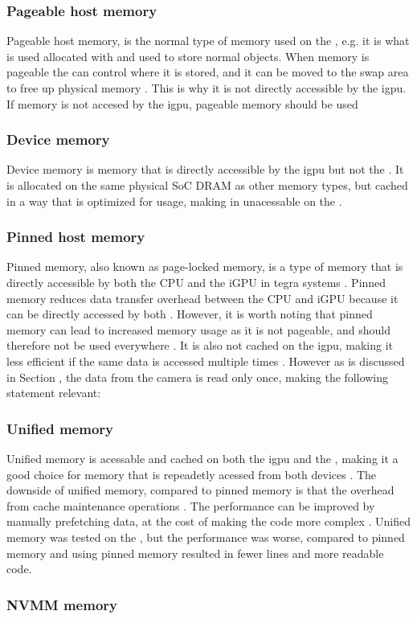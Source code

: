 \subsubsection{Pageable host memory}
Pageable host memory, is the normal type of memory used on the \jx,
e.g. it is what is used allocated with  and used to store normal \py objects.
When memory is pageable the \cpu can control where it is stored, and it can be moved to the \gls{swap} area to free up physical memory \cite[6]{nvidiaCUDAFTegra2023}.
This is why it is not directly accessible by the \gls{igpu}.
If memory is not accesed by the \gls{igpu}, pageable memory should be used \cite[9]{nvidiaCUDAFTegra2023}


\subsubsection{Device memory}
Device memory is memory that is directly accessible by the \gls{igpu} but not the \cpu \cite[5]{nvidiaCUDAFTegra2023}.
It is allocated on the same physical SoC DRAM as other memory types, but cached in a way that is optimized for \gpu usage, making in unacessable on the \cpu \cite[5]{nvidiaCUDAFTegra2023}.


\subsubsection{Pinned host memory}
Pinned memory, also known as page-locked memory, is a type of memory that is directly accessible by both the CPU and the iGPU in \gls{tegra} systems \cite{nvidiaCUDAFTegra2023}.
Pinned memory reduces data transfer overhead between the CPU and iGPU because it can be directly accessed by both \cite{nvidiaCUDAFTegra2023}.
However, it is worth noting that pinned memory can lead to increased memory usage as it is not pageable, and should therefore not be used everywhere \cite[38]{nvidiaCUDABestPractices2023}.
It is also not cached on the \gls{igpu}, making it less efficient if the same data is accessed multiple times \cite{nvidiaCUDAFTegra2023}.
However as is discussed in Section \todo, the data from the camera is read only once, making the following statement relevant:
\cite[10]{nvidiaCUDAFTegra2023}


\subsubsection{Unified memory}
Unified memory is acessable and cached on both the \gls{igpu} and the \cpu, making it a good choice for memory that is repeadetly acessed from both devices \cite[10]{nvidiaCUDAFTegra2023}.
The downside of unified memory, compared to pinned memory is that the overhead from cache maintenance operations \cite[12]{nvidiaCUDAFTegra2023}.
The performance can be improved by manually prefetching data, at the cost of making the code more complex \cite[13]{nvidiaCUDAFTegra2023}.
Unified memory was tested on the \sr, but the performance was worse, compared to pinned memory and using pinned memory resulted in fewer lines and more readable code.


\subsubsection{NVMM memory}
